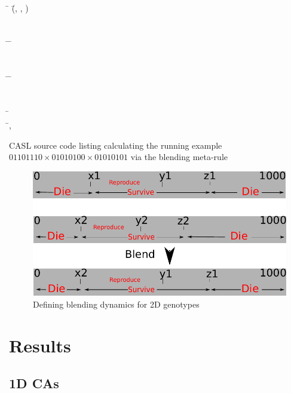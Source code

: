 \documentclass{AISB2008}
\begin{document}
\begin{listing}
{\begin{hetcasl}
\> \Ax{\bullet} \= (\=, , ) \Ax{=} \\
\\
\\
\VIEW \= \Ax{:} \=  \\
\\
\\
\VIEW \= \Ax{:} \=  \\
\\
\\
\SPEC \= \Ax{=}\\
\>  \=, \\
\end{hetcasl}}
\caption{CASL source code listing calculating the running example $01101110\times 01010100\times 01010101$ via the blending meta-rule\label{CASL-listing}}
\end{listing}

\newpage

\begin{figure}[!ht]
\includegraphics[width=\columnwidth]{2dgenotypeblend}
\caption{Defining blending dynamics for 2D genotypes\label{blending-2d-rule}}
\end{figure}


\section{Results}
\subsection{1D CAs} \label{1d-results}
\end{document}
